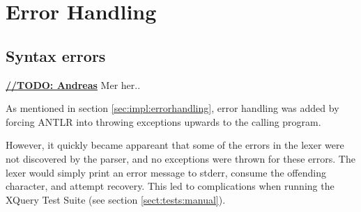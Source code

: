 \section{Error Handling}
\subsection{Syntax errors}
\label{sect:error_handling:syntax_errors}

\underline{\textbf{\LARGE //TODO: Andreas}} Mer her..
 
As mentioned in section \ref{sec:impl:errorhandling}, error handling was added
by forcing ANTLR into throwing exceptions upwards to the calling program.

However, it quickly became appareant that some of the errors in the lexer were
not discovered by the parser, and no exceptions were thrown for these errors. The
lexer would simply print an error message to stderr, consume the offending
character, and attempt recovery. This led to complications when running the
XQuery Test Suite (see section \ref{sect:tests:manual}).

